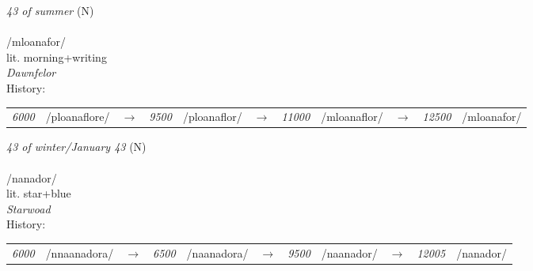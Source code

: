 \vspace{15pt}
\begin{nopagebreak}
 \textit{43 of summer} (N)\\
\\
\noindent /mloan{\textprimstress}afor/\\
\noindent lit. morning+writing\\
\noindent \textit{Dawnfelor}\\


\noindent History:

\vspace{-0pt}
\hspace{40pt}
\begin{tabular}{ccc}
\textit{6000} & /ploanaflore/&$\rightarrow$ & \textit{9500} & /ploanaflor/&$\rightarrow$ & \textit{11000} & /mloanaflor/&$\rightarrow$ & \textit{12500} & /mloanafor/& \\
\end{tabular}

\vspace{20pt}\hline

\end{nopagebreak}
\filbreak



\vspace{15pt}
\begin{nopagebreak}
 \textit{43 of winter/January 43} (N)\\
\\
\noindent /nan{\textprimstress}ador/\\
\noindent lit. star+blue\\
\noindent \textit{Starwoad}\\


\noindent History:

\vspace{-0pt}
\hspace{40pt}
\begin{tabular}{ccc}
\textit{6000} & /nnaanadora/&$\rightarrow$ & \textit{6500} & /naanadora/&$\rightarrow$ & \textit{9500} & /naanador/&$\rightarrow$ & \textit{12005} & /nanador/& \\
\end{tabular}

\vspace{20pt}\hline

\end{nopagebreak}
\filbreak



